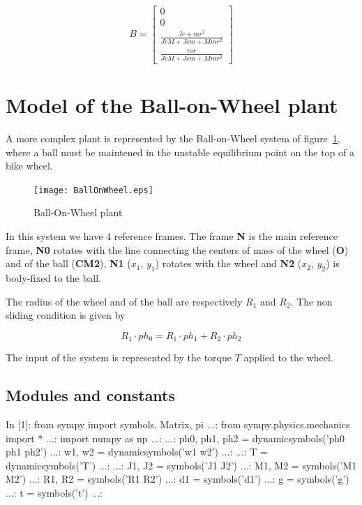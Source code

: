 $$
B=\left[\begin{matrix}0\\0\\\frac{Jc + m r^{2}}{Jc M + Jc m + M m 
r^{2}}\\\frac{m r}{Jc M + Jc m + M m r^{2}}\end{matrix}\right]
$$

\section{Model of the Ball-on-Wheel plant}

A more complex plant is represented by the Ball-on-Wheel system of 
figure~\ref{F9b}, where a ball must be maintened in the unstable equilibrium 
point on the top of a bike wheel.

\begin{figure}[htbp]	%
\centering
\texttt{[image: BallOnWheel.eps]}
\caption{Ball-On-Wheel plant}
\label{F9b}
\end{figure}

In this system we have 4 reference frames. The frame \textbf{N} is the main 
reference frame, \textbf{N0} rotates with the line connecting the centers of 
mass of the wheel (\textbf{O}) and of the ball (\textbf{CM2}), \textbf{N1} 
($x_1$, $y_1$) rotates with the wheel and \textbf{N2} ($x_2$, $y_2$) is 
body-fixed to the ball.

The radius of the wheel and of the ball are respectively $R_1$ and $R_2$. The 
non sliding condition is given by

$$
R_1 \cdot ph_0=R_1 \cdot ph_1 + R_2 \cdot ph_2
$$

The input of the system is represented by the torque $T$ applied to the wheel.

\subsection{Modules and constants}
\begin{code}
In [1]: from sympy import symbols, Matrix, pi
   ...: from sympy.physics.mechanics import *
   ...: import numpy as np
   ...: 
   ...: ph0, ph1, ph2 = dynamicsymbols('ph0 ph1 ph2')
   ...: w1, w2 = dynamicsymbols('w1 w2')
   ...: 
   ...: T = dynamicsymbols('T')
   ...: 
   ...: J1, J2 = symbols('J1 J2')
   ...: M1, M2 = symbols('M1 M2')
   ...: R1, R2 = symbols('R1 R2')
   ...: d1     = symbols('d1')
   ...: g      = symbols('g')
   ...: t      = symbols('t')
   ...: 
\end{code}

